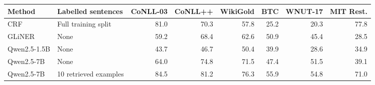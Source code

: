 \begingroup\small\setlength{\tabcolsep}{3pt}
\begin{tabular*}{\linewidth}{@{\extracolsep{\fill}}llrrrrrr@{}}
\toprule
Method & Labelled sentences & CoNLL-03 & CoNLL++ & WikiGold & BTC & WNUT-17 & MIT Rest. \\
\midrule
CRF & Full training split & 81.0 & 70.3 & 57.8 & 25.2 & 20.3 & 77.8 \\
GLiNER & None & 59.2 & 68.4 & 62.6 & 50.9 & 45.4 & 28.5 \\
Qwen2.5-1.5B & None & 43.7 & 46.7 & 50.4 & 39.9 & 28.6 & 34.9 \\
Qwen2.5-7B & None & 64.0 & 74.8 & 71.5 & 47.4 & 51.5 & 39.1 \\
Qwen2.5-7B & 10 retrieved examples & 84.5 & 81.2 & 76.3 & 55.9 & 54.8 & 71.0 \\
\bottomrule
\end{tabular*}
\endgroup
